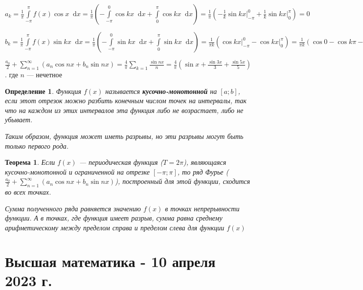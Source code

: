 \documentclass{article}
\newcommand*\diff{\mathop{}\!\mathrm{d}}
\newtheorem{definition}{Определение}
\newtheorem{theorem}{Теорема}
\begin{document}
$a_{k} = \frac{1}{\pi} \int\limits_{-\pi}^{\pi} f(x) \cos x \diff x = \frac{1}{\pi} (-\int\limits_{-\pi}^{0} \cos k x \diff x + \int\limits_{0}^{\pi} \cos k x \diff x) = \frac{1}{\pi} (-\frac{1}{k} \sin k x \bigg|^{0}_{-\pi} + \frac{1}{k} \sin k x \bigg|_{0}^{\pi}) = 0$

$b_{k} = \frac{1}{\pi} \int\limits_{-\pi}^{\pi} f(x) \sin k x \diff x = \frac{1}{\pi} (-\int\limits_{-\pi}^{0} \sin k x \diff x + \int\limits_{0}^{\pi} \sin k x \diff x) = \frac{1}{\pi k} (\cos k x \bigg|_{-\pi}^{0} - \cos k x \bigg|_{0}^{\pi}) = \frac{1}{\pi k} (\cos 0 - \cos k \pi - \cos k \pi + \cos 0) = \frac{1}{\pi k} (1 - \cos k \pi - \cos k \pi + 1) = \begin{cases}
    0, k \text{ — четное} \\
    \frac{4}{\pi k}, k \text{ — нечетное}
\end{cases}$

$\frac{a_0}{2} + \sum\limits_{n = 1}^{\infty} (a_{n} \cos n x + b_{n} \sin n x) = \frac{4}{\pi} \sum\limits_{k = 1} \frac{\sin n x}{n} = \frac{4}{\pi} (\sin x + \frac{\sin 3 x}{3} + \frac{\sin 5 x}{5})$. где $n$ — нечетное

\hfill

\begin{definition}

Функция $f(x)$ называется \textbf{кусочно-монотонной} на $[a; b]$, если этот отрезок можно разбить конечным числом точек на интервалы, так что на каждом из этих интервалов эта функция либо не возрастает, либо не убывает.

Таким образом, функция может иметь разрывы, но эти разрывы могут быть только первого рода.

\end{definition}

\begin{theorem}

Если $f(x)$ — периодическая функция ($T = 2 \pi$), являющаяся кусочно-монотонной и ограниченной на отрезке $[-\pi; \pi]$, то ряд Фурье ($\frac{a_0}{2} + \sum\limits_{n = 1}^{\infty} (a_{n} \cos n x + b_{n} \sin n x)$), построенный для этой функции, сходится во всех точках.

Сумма полученного ряда равняется значению $f(x)$ в точках непрерывности функции. А в точках, где функция имеет разрыв, сумма равна среднему арифметическому между пределом справа и пределом слева для функции $f(x)$

\end{theorem}

\section{Высшая математика - 10 апреля 2023 г.}
\end{document}
